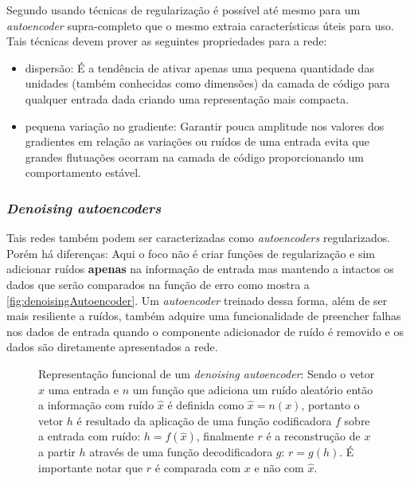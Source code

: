 				\par Segundo  usando técnicas de regularização é possível até mesmo para um \textit{autoencoder} supra-completo que o mesmo extraia características úteis para uso. Tais técnicas devem prover as seguintes propriedades para a rede:
				
				\begin{itemize}
					\item dispersão: É a tendência de ativar apenas uma pequena quantidade das unidades (também conhecidas como dimensões) da camada de código para qualquer entrada dada criando uma representação mais compacta.
					\item pequena variação no gradiente: Garantir pouca amplitude nos valores dos gradientes em relação as variações ou ruídos de uma entrada evita que grandes flutuações ocorram na camada de código proporcionando um comportamento estável.
				\end{itemize}

				
			\subsubsection{\textit{Denoising autoencoders}}
				\par Tais redes também podem ser caracterizadas como \textit{autoencoders} regularizados. Porém há diferenças: Aqui o foco não é criar funções de regularização e sim adicionar ruídos \textbf{apenas} na informação de entrada mas mantendo a intactos os dados que serão comparados na função de erro como mostra a  \autoref{fig:denoisingAutoencoder}. Um \textit{autoencoder} treinado dessa forma, além de ser mais resiliente a ruídos, também adquire uma funcionalidade de preencher falhas nos dados de entrada quando o componente adicionador de ruído é removido e os dados são diretamente apresentados a rede.
				
				\begin{figure}[H]
					\centering
					\caption[Representação funcional de um \textit{denoising autoencoder}]{Representação funcional de um \textit{denoising autoencoder}: Sendo o vetor $x$ uma entrada e $n$ um função que adiciona um ruído aleatório então a informação com ruído $\hat{x}$ é definida como $\hat{x} = n(x)$, portanto o vetor $h$ é resultado da aplicação de uma função codificadora $f$ sobre a entrada com ruído: $h = f(\hat{x})$, finalmente $r$ é a reconstrução de $x$ a partir $h$ através de uma função decodificadora $g$: $r = g(h)$. É importante notar que $r$ é comparada com $x$ e não com $\hat{x}$.}
					
					\label{fig:denoisingAutoencoder}
				\end{figure}

